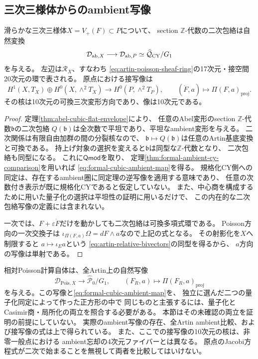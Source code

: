 \subsection{三次三様体からのambient写像}

\begin{corollary}[可換三次点での実際のambient変形写像]
\label{cor:formal-cubic-ambient-map}
滑らかな三次三様体$X=V_+(F)\subset P$について、
section $\mathbb Z$-代数の二次包絡は自然変換
\begin{equation}\label{eq:formal-cubic-ambient-map}
 \mathcal D_{\mathrm{ab},X}
 \longrightarrow\mathcal D_{\mathrm{ab},P}
 \simeq\widehat{\mathcal Q}_{\mathrm{CY}}/G_1
\end{equation}
を与える。
左辺は$\mathcal R_X$、すなわち
\eqref{eq:artin-poisson-sheaf-ring}の17次元・接空間20次元の環で表される。
原点における接写像は
\[
 H^1(X,T_X)\oplus H^0(X,\wedge^2T_X)
 \longrightarrow H^0(P,\wedge^2T_P),
 \qquad(\dot F,a)\longmapsto\Pi(F,a)_{\mathrm{proj}}.
\]
その核は10次元の可換三次変形方向であり、像は10次元である。
\end{corollary}
\begin{proof}
定理\ref{thm:abel-cubic-flat-envelope}により、
任意のAbel変形のsection $\mathbb Z$-代数$\mathfrak b$の二次包絡
$Q(\mathfrak b)$は全次数で平坦であり、平坦なambient変形を与える。
二次関係は有限自由加群の間の分裂核なので、
$\mathfrak b\mapsto Q(\mathfrak b)$は任意のArtin基底変換と可換である。
持上げ対象の選択を変えると$\mathfrak b$は同型な$\mathbb Z$-代数となり、
二次包絡も同型になる。
これに$\mathsf{Qmod}$を取り、
定理\ref{thm:formal-ambient-cy-comparison}を用いれば
\eqref{eq:formal-cubic-ambient-map}を得る。
規格化CY側への同定は、存在するambient圏に同定理の逆写像を適用する意味であり、
任意の次数付き表示が既に規格化CYであると仮定していない。
また、中心商を構成するために用いた量子化の選択は平坦性の証明に用いるだけで、
この内在的な二次包絡写像の定義には含まれない。

一次では、$F+\varepsilon\dot F$だけを動かしても二次包絡は可換多項式環である。
Poisson方向の一次交換子は
$\iota_{\Pi(F,a)}\Omega=dF\wedge a$なので上記の式となる。
その射影化を$X$へ制限すると
$a\mapsto\iota_Ea$という
\eqref{eq:artin-relative-bivectors}の同型を得るから、
$a$方向の写像は単射である。
\end{proof}

\begin{remark}[Poisson座標での式と比較の範囲]
相対Poisson計算自体は、全Artin上の自然写像
\[
 \mathcal D_{\mathrm{Pois},X}\longrightarrow
 \widehat{\mathcal P}_0/G_1,
 \qquad (F_R,a)\longmapsto\Pi(F_R,a)_{\mathrm{proj}}
\]
を与える。この写像と\eqref{eq:formal-cubic-ambient-map}を、
独立に選んだ二つの量子化同定によって作った正方形の中で
同じものと主張するには、量子化とCasimir商・局所化の両立を照合する必要がある。
本節はその未確認の両立を証明の前提にしていない。
実際のambient写像の存在、全Artin ambient比較、および接写像の式は上で得られている。
また、ここでの接写像の10次元の核は、非零一般点における
ambient忘却の4次元ファイバーとは異なる。
原点のJacobi方程式が二次で始まることを無視して両者を比較してはいけない。
\end{remark}
